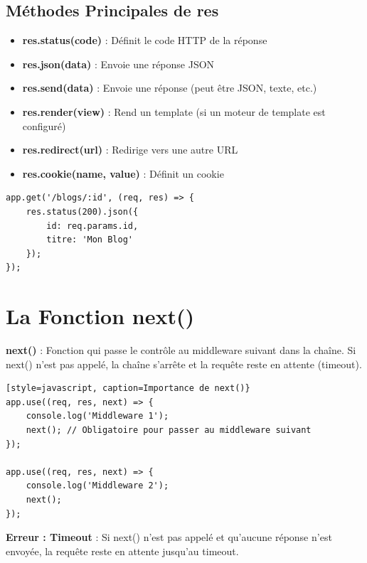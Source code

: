 \subsection{Méthodes Principales de res}

\begin{itemize}
    \item \textbf{res.status(code)} : Définit le code HTTP de la réponse
    \item \textbf{res.json(data)} : Envoie une réponse JSON
    \item \textbf{res.send(data)} : Envoie une réponse (peut être JSON, texte, etc.)
    \item \textbf{res.render(view)} : Rend un template (si un moteur de template est configuré)
    \item \textbf{res.redirect(url)} : Redirige vers une autre URL
    \item \textbf{res.cookie(name, value)} : Définit un cookie
\end{itemize}

\begin{lstlisting}[style=javascript, caption=Exemple d'utilisation de res]
app.get('/blogs/:id', (req, res) => {
    res.status(200).json({
        id: req.params.id,
        titre: 'Mon Blog'
    });
});
\end{lstlisting}

\section{La Fonction next()}

\begin{definitionbox}
    \textbf{next()} : Fonction qui passe le contrôle au middleware suivant dans la chaîne. Si next() n'est pas appelé, la chaîne s'arrête et la requête reste en attente (timeout).
\end{definitionbox}

\begin{lstlisting}[style=javascript, caption=Importance de next()}
app.use((req, res, next) => {
    console.log('Middleware 1');
    next(); // Obligatoire pour passer au middleware suivant
});

app.use((req, res, next) => {
    console.log('Middleware 2');
    next();
});
\end{lstlisting}

\begin{errorbox}
    \textbf{Erreur : Timeout} : Si next() n'est pas appelé et qu'aucune réponse n'est envoyée, la requête reste en attente jusqu'au timeout.
\end{errorbox}

